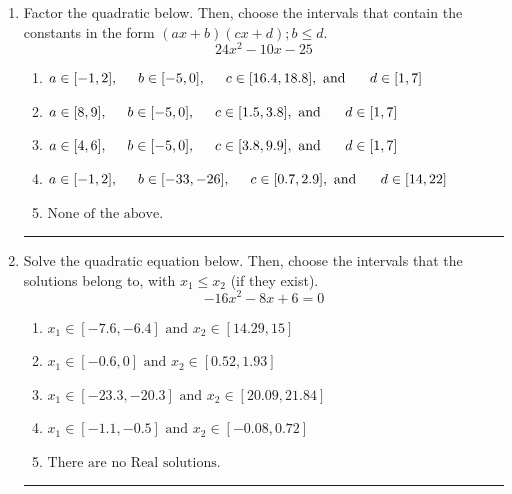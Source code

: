 \documentclass[14pt]{extbook}
\newcommand{\litem}[1]{\item#1\hspace*{-1cm}\rule{\textwidth}{0.4pt}}
\begin{document}
\begin{enumerate}
\litem{
Factor the quadratic below. Then, choose the intervals that contain the constants in the form $(ax+b)(cx+d); b \leq d.$\[ 24x^{2} -10 x -25 \]\begin{enumerate}[label=\Alph*.]
\item \( a \in [-1, 2], \hspace*{5mm} b \in [-5, 0], \hspace*{5mm} c \in [16.4, 18.8], \text{ and } \hspace*{5mm} d \in [1, 7] \)
\item \( a \in [8, 9], \hspace*{5mm} b \in [-5, 0], \hspace*{5mm} c \in [1.5, 3.8], \text{ and } \hspace*{5mm} d \in [1, 7] \)
\item \( a \in [4, 6], \hspace*{5mm} b \in [-5, 0], \hspace*{5mm} c \in [3.8, 9.9], \text{ and } \hspace*{5mm} d \in [1, 7] \)
\item \( a \in [-1, 2], \hspace*{5mm} b \in [-33, -26], \hspace*{5mm} c \in [0.7, 2.9], \text{ and } \hspace*{5mm} d \in [14, 22] \)
\item \( \text{None of the above.} \)

\end{enumerate} }
\litem{
Solve the quadratic equation below. Then, choose the intervals that the solutions belong to, with $x_1 \leq x_2$ (if they exist).\[ -16x^{2} -8 x + 6 = 0 \]\begin{enumerate}[label=\Alph*.]
\item \( x_1 \in [-7.6, -6.4] \text{ and } x_2 \in [14.29, 15] \)
\item \( x_1 \in [-0.6, 0] \text{ and } x_2 \in [0.52, 1.93] \)
\item \( x_1 \in [-23.3, -20.3] \text{ and } x_2 \in [20.09, 21.84] \)
\item \( x_1 \in [-1.1, -0.5] \text{ and } x_2 \in [-0.08, 0.72] \)
\item \( \text{There are no Real solutions.} \)


\end{enumerate}}
\end{enumerate}
\end{document}
